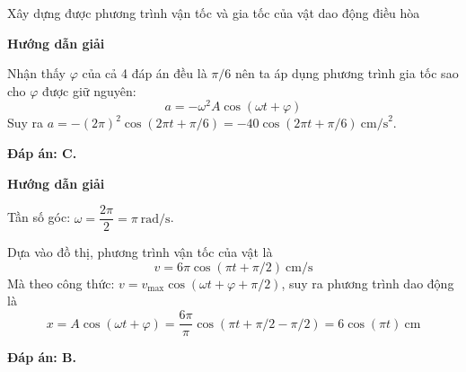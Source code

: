 \begin{dang}{Xây dựng được phương trình vận tốc và gia tốc của vật dao động điều hòa}
	{\begin{center}
			\textbf{Hướng dẫn giải}
		\end{center}
		Nhận thấy $\varphi$ của cả 4 đáp án đều là $\pi /6$ nên ta áp dụng phương trình gia tốc sao cho $\varphi$ được giữ nguyên:
		$$a=-\omega ^2 A \cos (\omega t + \varphi)$$
		Suy ra $a=-(2\pi)^2 \cos (2\pi t + \pi /6) = -40 \cos(2\pi t + \pi /6) \ \text{cm/s}^2$.
		
		\textbf{Đáp án: C.}
	}
	
	{\begin{center}
			\textbf{Hướng dẫn giải}
		\end{center}
		Tần số góc: $\omega = \dfrac{2\pi}{2}=\pi\ \text{rad/s}$.
		
		
		Dựa vào đồ thị, phương trình vận tốc của vật là
		$$v= 6\pi \cos(\pi t + \pi /2)\ \text{cm/s}$$
		Mà theo công thức: $v=v_\text{max}\cos(\omega t + \varphi + \pi /2)$, suy ra phương trình dao động là
		$$x=A\cos (\omega t + \varphi) = \dfrac{6\pi}{\pi}\cos (\pi t + \pi /2 - \pi /2) = 6\cos(\pi t)\ \text{cm}$$
		
		\textbf{Đáp án: B.}
	}
\end{dang}

